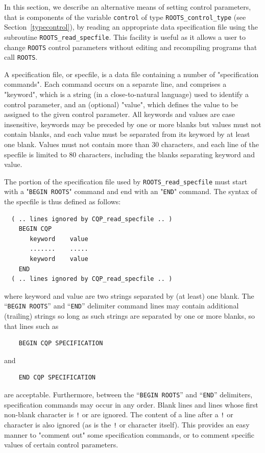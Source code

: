 \documentclass{galahad}
\newcommand{\packagename}{ROOTS}
\begin{document}

\galfeatures
\noindent In this section, we describe an alternative means of setting 
control parameters, that is components of the variable {\tt control} of type
{\tt \packagename\_control\_type}
(see Section~\ref{typecontrol}), 
by reading an appropriate data specification file using the
subroutine {\tt \packagename\_read\_specfile}. This facility
is useful as it allows a user to change  {\tt \packagename} control parameters 
without editing and recompiling programs that call {\tt \packagename}.

A specification file, or specfile, is a data file containing a number of 
"specification commands". Each command occurs on a separate line, 
and comprises a "keyword", 
which is a string (in a close-to-natural language) used to identify a 
control parameter, and 
an (optional) "value", which defines the value to be assigned to the given
control parameter. All keywords and values are case insensitive, 
keywords may be preceded by one or more blanks but
values must not contain blanks, and
each value must be separated from its keyword by at least one blank.
Values must not contain more than 30 characters, and 
each line of the specfile is limited to 80 characters,
including the blanks separating keyword and value.

The portion of the specification file used by 
{\tt \packagename\_read\_specfile}
must start
with a "{\tt BEGIN \packagename}" command and end with an 
"{\tt END}" command.  The syntax of the specfile is thus defined as follows:
\begin{verbatim}
  ( .. lines ignored by CQP_read_specfile .. )
    BEGIN CQP
       keyword    value
       .......    .....
       keyword    value
    END 
  ( .. lines ignored by CQP_read_specfile .. )
\end{verbatim}
where keyword and value are two strings separated by (at least) one blank.
The ``{\tt BEGIN \packagename}'' and ``{\tt END}'' delimiter command lines 
may contain additional (trailing) strings so long as such strings are 
separated by one or more blanks, so that lines such as
\begin{verbatim}
    BEGIN CQP SPECIFICATION
\end{verbatim}
and
\begin{verbatim}
    END CQP SPECIFICATION
\end{verbatim}
are acceptable. Furthermore, 
between the
``{\tt BEGIN \packagename}'' and ``{\tt END}'' delimiters,
specification commands may occur in any order.  Blank lines and
lines whose first non-blank character is {\tt !} or {\tt *} are ignored. 
The content 
of a line after a {\tt !} or {\tt *} character is also 
ignored (as is the {\tt !} or {\tt *}
character itself). This provides an easy manner to "comment out" some 
specification commands, or to comment specific values 
of certain control parameters.  
\end{document}
